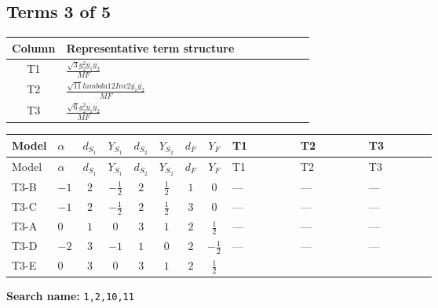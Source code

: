 \documentclass[8pt]{article}
\begin{document}
\begin{landscape}
\subsection*{Terms 3 of 5}
\begin{center}
\begin{tabular}{@{}c >{\raggedright\arraybackslash}p{0.82\linewidth}@{}}
\toprule
Column & Representative term structure \\
\midrule
T1 & \(\displaystyle \frac{\sqrt{3} g_{2}^{2} \overline{y_{1}} \overline{y_{2}}}{MF}\) \\
\midrule
T2 & \(\displaystyle \frac{\sqrt{11} lambda12Inv2 \overline{y_{1}} \overline{y_{2}}}{MF}\) \\
\midrule
T3 & \(\displaystyle \frac{\sqrt{6} g_{2}^{2} \overline{y_{1}} \overline{y_{2}}}{MF}\) \\
\midrule
\bottomrule
\end{tabular}
\end{center}
\smallskip
\tiny
\begin{longtable}{@{}llcccccc >{\raggedright\arraybackslash}p{0.21\linewidth} >{\raggedright\arraybackslash}p{0.21\linewidth} >{\raggedright\arraybackslash}p{0.21\linewidth}@{}}
\toprule
Model & $\alpha$ & $d_{S_1}$ & $Y_{S_1}$ & $d_{S_2}$ & $Y_{S_2}$ & $d_F$ & $Y_F$ & T1 & T2 & T3 \\
\midrule
\endfirsthead
\toprule
Model & $\alpha$ & $d_{S_1}$ & $Y_{S_1}$ & $d_{S_2}$ & $Y_{S_2}$ & $d_F$ & $Y_F$ & T1 & T2 & T3 \\
\midrule
\endhead
T3-B & $-1$ & $2$ & $-\frac{1}{2}$ & $2$ & $\frac{1}{2}$ & $1$ & $0$ & --- & --- & --- \\
\midrule
T3-C & $-1$ & $2$ & $-\frac{1}{2}$ & $2$ & $\frac{1}{2}$ & $3$ & $0$ & --- & --- & --- \\
\midrule
T3-A & $0$ & $1$ & $0$ & $3$ & $1$ & $2$ & $\frac{1}{2}$ & --- & --- & --- \\
\midrule
T3-D & $-2$ & $3$ & $-1$ & $1$ & $0$ & $2$ & $-\frac{1}{2}$ & --- & --- & --- \\
\midrule
T3-E & $0$ & $3$ & $0$ & $3$ & $1$ & $2$ & $\frac{1}{2}$ & \scriptsize\adjustbox{max width=\linewidth}{$\begin{gathered} - \frac{15 \sqrt{3} g_{2}^{2} \overline{y_{1}} \overline{y_{2}}}{8 MF}\end{gathered}$} & \scriptsize\adjustbox{max width=\linewidth}{$\begin{gathered} - \frac{3 \sqrt{11} lambda12Inv2 \overline{y_{1}} \overline{y_{2}}}{22 MF}\end{gathered}$} & \scriptsize\adjustbox{max width=\linewidth}{$\begin{gathered} - \frac{\sqrt{6} g_{2}^{2} \overline{y_{1}} \overline{y_{2}}}{6 MF}\end{gathered}$} \\
\midrule
\bottomrule
\end{longtable}
\clearpage
\noindent\textbf{Search name: }\texttt{1,2,10,11}\par\smallskip

\end{landscape}
\end{document}
